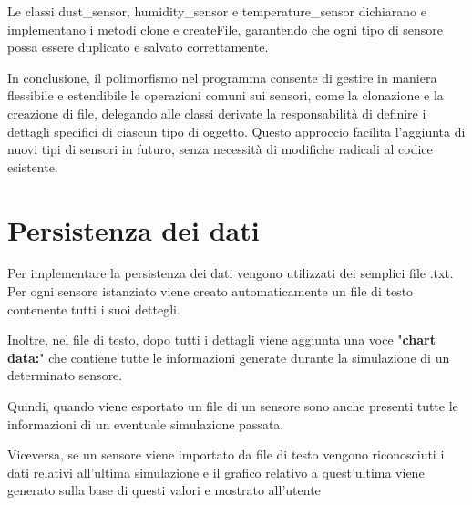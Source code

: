 \documentclass{article}
\begin{document}
\noindent Le classi dust\_sensor, humidity\_sensor e temperature\_sensor dichiarano e implementano i metodi clone e createFile, garantendo che ogni tipo di sensore possa essere duplicato e salvato correttamente.


In conclusione, il polimorfismo nel programma consente di gestire in maniera flessibile e estendibile le operazioni comuni sui sensori, come la clonazione e la creazione di file, delegando alle classi derivate la responsabilità di definire i dettagli specifici di ciascun tipo di oggetto.   Questo approccio facilita l'aggiunta di nuovi tipi di sensori in futuro, senza necessità di modifiche radicali al codice esistente.

\section{Persistenza dei dati}
Per implementare la persistenza dei dati vengono utilizzati dei semplici file .txt.
Per ogni sensore istanziato viene creato automaticamente un file di testo contenente tutti i suoi dettegli. 

\noindent Inoltre, nel file di testo, dopo tutti i dettagli viene aggiunta una voce "\textbf{chart data:}" che contiene tutte le informazioni generate durante la simulazione di un determinato sensore.

\noindent Quindi, quando viene esportato un file di un sensore sono anche presenti tutte le informazioni di un eventuale simulazione passata.

\noindent Viceversa, se un sensore viene importato da file di testo vengono riconosciuti i dati relativi all’ultima simulazione e il grafico relativo a quest’ultima viene generato sulla base di questi valori e mostrato all’utente
\end{document}
